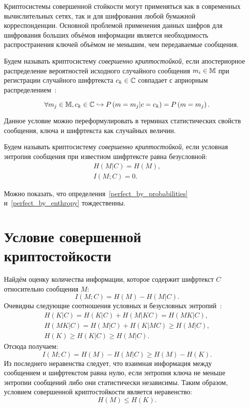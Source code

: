 Криптосистемы совершенной стойкости могут применяться как в современных вычислительных сетях, так и для шифрования любой бумажной корреспонденции. Основной проблемой применения данных шифров для шифрования больших объёмов информации является необходимость распространения ключей объёмом не меньшим, чем передаваемые сообщения.

\begin{definition}\label{perfect_by_probabilities}
Будем называть криптосистему \emph{совершенно криптостойкой}, если апостериорное распределение вероятностей исходного случайного сообщения $m_i \in \mathbb{M}$ при регистрации случайного шифртекста $c_k \in \mathbb{C}$ совпадает с априорным распределением~\cite{Gultyaeva:2010}:

	\[\forall m_j \in \mathbb{M}, c_k \in \mathbb{C} \hookrightarrow P \left( m = m_j | c = c_k \right) = P \left( m = m_j \right).\]
\end{definition}

Данное условие можно переформулировать в терминах статистических свойств сообщения, ключа и шифртекста как случайных величин.

\begin{definition}\label{perfect_by_enthropy}
Будем называть криптосистему \emph{совершенно криптостойкой}, если условная энтропия сообщения при известном шифртексте равна безусловной:
\begin{gather*}
	H \left( M | C \right) = H \left( M \right),\\
	I \left( M; C \right) = 0.
\end{gather*}
\end{definition}

Можно показать, что определения~\ref{perfect_by_probabilities} и~\ref{perfect_by_enthropy} тождественны.

\section[Условие]{Условие совершенной криптостойкости}

Найдём оценку количества информации, которое содержит шифртекст $C$ относительно сообщения $M$:
\[ I(M; C) = H(M) - H(M | C). \]
Очевидны следующие соотношения условных и безусловных энтропий~\cite{GabPil:2007}:
\begin{gather*}
H(K|C)=H(K|C)+H(M|KC)=H(MK|C),\\
H(MK|C)=H(M|C)+H(K|MC)\geq H(M|C),\\
H(K)\geq H(K|C)\geq H(M|C).
\end{gather*}
Отсюда получаем:
 \[ I(M; C) = H(M) - H(M | C)\geq H(M)-H(K). \]
Из последнего неравенства следует, что взаимная информация между сообщением и шифртекстом равна нулю, если энтропия ключа не меньше энтропии сообщений либо они статистически независимы. Таким образом, условием совершенной криптостойкости является неравенство:
\[ H(M) \leq H(K).\]

